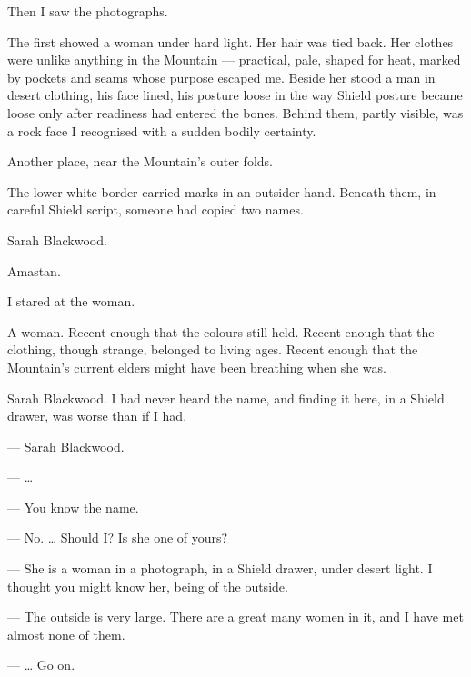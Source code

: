 \ornament

Then I saw the photographs.\par

The first showed a woman under hard light. Her hair was tied back. Her clothes were unlike anything in the Mountain --- practical, pale, shaped for heat, marked by pockets and seams whose purpose escaped me. Beside her stood a man in desert clothing, his face lined, his posture loose in the way Shield posture became loose only after readiness had entered the bones. Behind them, partly visible, was a rock face I recognised with a sudden bodily certainty.\par

Another place, near the Mountain's outer folds.\par

The lower white border carried marks in an outsider hand. Beneath them, in careful Shield script, someone had copied two names.\par

Sarah Blackwood.\par

Amastan.\par

I stared at the woman.\par

A woman. Recent enough that the colours still held. Recent enough that the clothing, though strange, belonged to living ages. Recent enough that the Mountain's current elders might have been breathing when she was.\par

Sarah Blackwood. I had never heard the name, and finding it here, in a Shield drawer, was worse than if I had.\par

\ornament

\begin{room}

--- Sarah Blackwood.

--- \ldots{}

--- You know the name.

--- No. \ldots{} Should I? Is she one of yours?

--- She is a woman in a photograph, in a Shield drawer, under desert light. I thought you might know her, being of the outside.

--- The outside is very large. There are a great many women in it, and I have met almost none of them.

--- \ldots{} Go on.

\end{room}

